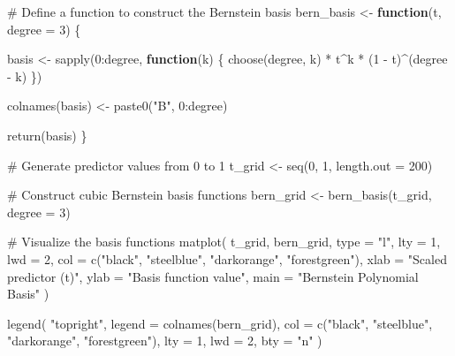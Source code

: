 \documentclass[
  letterpaper,
  DIV=11,
  numbers=noendperiod]{scrreprt}
\newenvironment{Shaded}{\begin{snugshade}}{\end{snugshade}}
\newcommand{\AttributeTok}[1]{\textcolor[rgb]{0.40,0.45,0.13}{#1}}
\newcommand{\CommentTok}[1]{\textcolor[rgb]{0.37,0.37,0.37}{#1}}
\newcommand{\ControlFlowTok}[1]{\textcolor[rgb]{0.00,0.23,0.31}{\textbf{#1}}}
\newcommand{\DecValTok}[1]{\textcolor[rgb]{0.68,0.00,0.00}{#1}}
\newcommand{\FunctionTok}[1]{\textcolor[rgb]{0.28,0.35,0.67}{#1}}
\newcommand{\NormalTok}[1]{\textcolor[rgb]{0.00,0.23,0.31}{#1}}
\newcommand{\OtherTok}[1]{\textcolor[rgb]{0.00,0.23,0.31}{#1}}
\newcommand{\SpecialCharTok}[1]{\textcolor[rgb]{0.37,0.37,0.37}{#1}}
\newcommand{\StringTok}[1]{\textcolor[rgb]{0.13,0.47,0.30}{#1}}
\begin{document}
\begin{Shaded}
\begin{Highlighting}[]
\CommentTok{\# Define a function to construct the Bernstein basis}
\NormalTok{bern\_basis }\OtherTok{\textless{}{-}} \ControlFlowTok{function}\NormalTok{(t, }\AttributeTok{degree =} \DecValTok{3}\NormalTok{) \{}

\NormalTok{  basis }\OtherTok{\textless{}{-}} \FunctionTok{sapply}\NormalTok{(}\DecValTok{0}\SpecialCharTok{:}\NormalTok{degree, }\ControlFlowTok{function}\NormalTok{(k) \{}
    \FunctionTok{choose}\NormalTok{(degree, k) }\SpecialCharTok{*}
\NormalTok{      t}\SpecialCharTok{\^{}}\NormalTok{k }\SpecialCharTok{*}
\NormalTok{      (}\DecValTok{1} \SpecialCharTok{{-}}\NormalTok{ t)}\SpecialCharTok{\^{}}\NormalTok{(degree }\SpecialCharTok{{-}}\NormalTok{ k)}
\NormalTok{  \})}

  \FunctionTok{colnames}\NormalTok{(basis) }\OtherTok{\textless{}{-}} \FunctionTok{paste0}\NormalTok{(}\StringTok{"B"}\NormalTok{, }\DecValTok{0}\SpecialCharTok{:}\NormalTok{degree)}

  \FunctionTok{return}\NormalTok{(basis)}
\NormalTok{\}}

\CommentTok{\# Generate predictor values from 0 to 1}
\NormalTok{t\_grid }\OtherTok{\textless{}{-}} \FunctionTok{seq}\NormalTok{(}\DecValTok{0}\NormalTok{, }\DecValTok{1}\NormalTok{, }\AttributeTok{length.out =} \DecValTok{200}\NormalTok{)}

\CommentTok{\# Construct cubic Bernstein basis functions}
\NormalTok{bern\_grid }\OtherTok{\textless{}{-}} \FunctionTok{bern\_basis}\NormalTok{(t\_grid, }\AttributeTok{degree =} \DecValTok{3}\NormalTok{)}

\CommentTok{\# Visualize the basis functions}
\FunctionTok{matplot}\NormalTok{(}
\NormalTok{  t\_grid, bern\_grid,}
  \AttributeTok{type =} \StringTok{"l"}\NormalTok{, }\AttributeTok{lty =} \DecValTok{1}\NormalTok{, }\AttributeTok{lwd =} \DecValTok{2}\NormalTok{,}
  \AttributeTok{col =} \FunctionTok{c}\NormalTok{(}\StringTok{"black"}\NormalTok{, }\StringTok{"steelblue"}\NormalTok{,}
          \StringTok{"darkorange"}\NormalTok{, }\StringTok{"forestgreen"}\NormalTok{),}
  \AttributeTok{xlab =} \StringTok{"Scaled predictor (t)"}\NormalTok{,}
  \AttributeTok{ylab =} \StringTok{"Basis function value"}\NormalTok{,}
  \AttributeTok{main =} \StringTok{"Bernstein Polynomial Basis"}
\NormalTok{)}

\FunctionTok{legend}\NormalTok{(}
  \StringTok{"topright"}\NormalTok{,}
  \AttributeTok{legend =} \FunctionTok{colnames}\NormalTok{(bern\_grid),}
  \AttributeTok{col =} \FunctionTok{c}\NormalTok{(}\StringTok{"black"}\NormalTok{, }\StringTok{"steelblue"}\NormalTok{,}
          \StringTok{"darkorange"}\NormalTok{, }\StringTok{"forestgreen"}\NormalTok{),}
  \AttributeTok{lty =} \DecValTok{1}\NormalTok{, }\AttributeTok{lwd =} \DecValTok{2}\NormalTok{, }\AttributeTok{bty =} \StringTok{"n"}
\NormalTok{)}
\end{Highlighting}
\end{Shaded}
\end{document}
